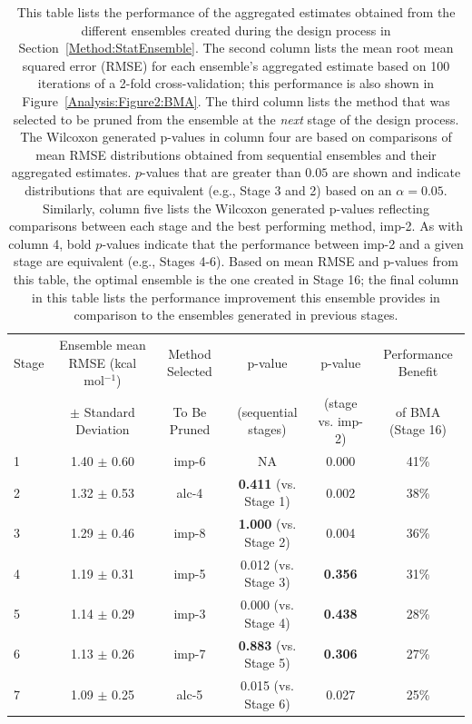 \documentclass[journal=jpcbfk, manuscript=article]{achemso}
\newcommand{\+}[1]{\ensuremath{\mathbf{#1}}}
\begin{document}
\begin{table}[t!]
	\centering
	\caption[Table 2]{This table lists the performance of the aggregated estimates obtained from the different ensembles created during the design process in Section~\ref{Method:StatEnsemble}.
	The second column lists the mean root mean squared error (RMSE) for each ensemble's aggregated estimate based on 100 iterations of a 2-fold cross-validation; this performance is also shown in Figure~\ref{Analysis:Figure2:BMA}.
	The third column lists the method that was selected to be pruned from the ensemble at the \emph{next} stage of the design process.
	The Wilcoxon generated p-values in column four are based on comparisons of mean RMSE distributions obtained from sequential ensembles and their aggregated estimates.
	$p$-values that are greater than $0.05$ are shown and indicate distributions that are equivalent (e.g., Stage 3 and 2) based on an $\alpha = 0.05$.
	Similarly, column five lists the Wilcoxon generated p-values reflecting comparisons between each stage and the best performing method, imp-2.
	As with column 4, bold $p$-values indicate that the performance between imp-2 and a given stage are equivalent (e.g., Stages 4-6).
	Based on mean RMSE and p-values from this table, the optimal ensemble is the one created in Stage 16; the final column in this table lists the performance improvement this ensemble provides in comparison to the ensembles generated in previous stages.}
	\scriptsize
	\begin{tabular}{l|c|c|c|c|c}
		\hline
		\hline
		Stage & Ensemble mean RMSE (kcal mol$^{-1}$) & Method Selected & p-value & p-value  & Performance  Benefit\\
		 & $\pm$ Standard Deviation & To Be Pruned & (sequential stages) & (stage vs. imp-2)  &  of BMA (Stage 16)\\
		\hline
		 1 & 1.40 $\pm$ 0.60 & imp-6 & NA & 0.000 & 41\%\\
		 2  & 1.32 $\pm$ 0.53 & alc-4&  \textbf{0.411} (vs. Stage 1) & 0.002 & 38\%\\
		 3 & 1.29 $\pm$ 0.46 & imp-8 & \textbf{1.000}  (vs. Stage 2) & 0.004 & 36\%\\
		 4 & 1.19 $\pm$ 0.31 & imp-5 & 0.012  (vs. Stage 3) & \textbf{0.356} & 31\%\\
		 5 & 1.14 $\pm$ 0.29 & imp-3 & 0.000  (vs. Stage 4) & \textbf{0.438} & 28\%\\
		 6 & 1.13 $\pm$ 0.26 & imp-7 & \textbf{0.883}  (vs. Stage 5)& \textbf{0.306} & 27\%\\
		 7 & 1.09 $\pm$ 0.25 & alc-5 & 0.015  (vs. Stage 6) &  0.027 & 25\%\\

\end{tabular}
\end{table}
\end{document}
